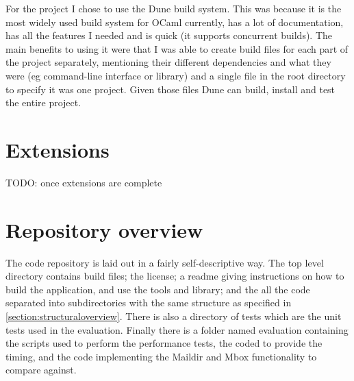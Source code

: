 For the project I chose to use the Dune\cite{code_dune} build system. This was because it is the most widely used build system for OCaml currently, has a lot of documentation, has all the features I needed and is quick (it supports concurrent builds). The main benefits to using it were that I was able to create build files for each part of the project separately, mentioning their different dependencies and what they were (eg command-line interface or library) and a single file in the root directory to specify it was one project. Given those files Dune can build, install and test the entire project.

\section{Extensions} \label{section:extensions}

TODO: once extensions are complete

\section{Repository overview}

The code repository is laid out in a fairly self-descriptive way. The top level directory contains build files; the license; a readme giving instructions on how to build the application, and use the tools and library; and the all the code separated into subdirectories with the same structure as specified in \ref{section:structuraloverview}. There is also a directory of tests which are the unit tests used in the evaluation. Finally there is a folder named evaluation containing the scripts used to perform the performance tests, the coded to provide the timing, and the code implementing the Maildir and Mbox functionality to compare against.
